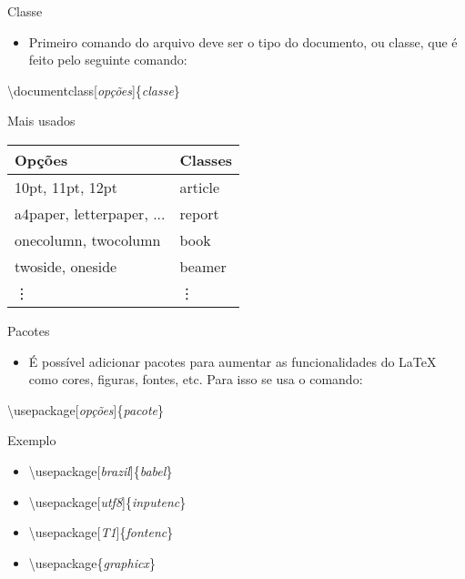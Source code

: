 \begin{frame}[allowframebreaks]{Classe}
	\begin{itemize}
	\item Primeiro comando do arquivo deve ser o tipo do documento, ou classe, que é feito pelo seguinte comando:
	\end{itemize}

	\alert{\textbackslash documentclass[\textit{opções}]\{\textit{classe}\}}

	\vspace{.5cm}
	
	\begin{block}{Mais usados}
		\begin{center}
		\begin{tabular}{|l|l|}
		\hline
		{\bf Opções}				& {\bf Classes} \\
		\hline
		10pt, 11pt, 12pt			& article		\\
		a4paper, letterpaper, ...	& report		\\
		onecolumn, twocolumn		& book			\\
		twoside, oneside			& beamer		\\
		\vdots						& \vdots		\\
		\hline
		\end{tabular}
		\end{center}
	\end{block}
\end{frame}

\begin{frame}{Pacotes}
	\begin{itemize}
	\item É possível adicionar pacotes para aumentar as funcionalidades do \LaTeX\, como cores, figuras, fontes, etc. Para isso	se usa o comando:
	\end{itemize}

	\alert{\textbackslash usepackage[\textit{opções}]\{\textit{pacote}\}}

	\vspace{.5cm}

	\begin{exampleblock}{Exemplo}
		\begin{itemize}
		\item \textbackslash usepackage[\textit{brazil}]\{\textit{babel}\}
		\item \textbackslash usepackage[\textit{utf8}]\{\textit{inputenc}\}
		\item \textbackslash usepackage[\textit{T1}]\{\textit{fontenc}\}
		\item \textbackslash usepackage\{\textit{graphicx}\}
		\end{itemize}
	\end{exampleblock}
\end{frame}

